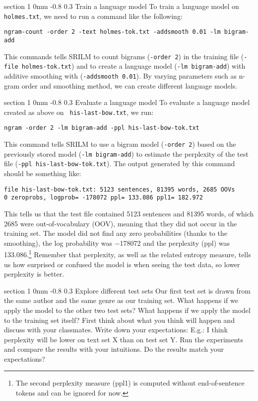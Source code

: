 \documentclass[11pt]{article}
\makeatletter
\newcommand{\newsec}[2]{\section{#1}\label{sec:#2}\noindent}
\renewcommand{\section}{\@startsection
{section}%
{1}%
{0mm}%
{-0.8\baselineskip}%
{0.3\baselineskip}%
{\bfseries\large}}%
\makeatother
\begin{document}
\newsec{Train a language model}{train}%
To train a language model on {\tt holmes.txt}, we need to run a
command like the following:
\begin{verbatim}
ngram-count -order 2 -text holmes-tok.txt -addsmooth 0.01 -lm bigram-add
\end{verbatim}
This commands tells SRILM to count bigrams ({\tt -order~2}) in the training file ({\tt -file~holmes-tok.txt})
and to create a language model ({\tt -lm~bigram-add}) with additive smoothing with ({\tt -addsmooth~0.01}).
By varying parameters such as n-gram order and smoothing method, we can create different language models.

\newsec{Evaluate a language model}{eval}%
To evaluate a language model created as above on {\tt
  his-last-bow.txt}, we run:
\begin{verbatim}
ngram -order 2 -lm bigram-add -ppl his-last-bow-tok.txt
\end{verbatim}
This command tells SRILM to use a bigram model ({\tt -order~2}) based
on the previously stored model ({\tt -lm~bigram-add}) to estimate the
perplexity of the test file ({\tt -ppl~his-last-bow-tok.txt}). The
output generated by this command should be something like:
\begin{verbatim}
file his-last-bow-tok.txt: 5123 sentences, 81395 words, 2685 OOVs
0 zeroprobs, logprob= -178072 ppl= 133.086 ppl1= 182.972
\end{verbatim}
This tells us that the test file contained 5123 sentences and 81395
words, of which 2685 were out-of-vocabulary (OOV), meaning that they
did not occur in the training set. The model did not find any zero
probabilities (thanks to the smoothing), the log probability was
$-$178072 and the perplexity (ppl) was 133.086.\footnote{The second
  perplexity measure (ppl1) is computed without end-of-sentence tokens
  and can be ignored for now.} Remember that perplexity, as well as
the related entropy measure, tells us how surprised or confused the
model is when seeing the test data, so lower perplexity is better.

\newsec{Explore different test sets }{sets}%
Our first test set is drawn from the same author and the same genre as
our training set. What happens if we apply the model to the other two
test sets? What happens if we apply the model to the training set
itself? First think about what you think will happen and discuss with your
classmates. Write down your expectations: E.g.: I think perplexity will be
lower on text set X than on test set Y.
Run the experiments and compare the results with your intuitions. Do the
results match your expectations? 
\end{document}
